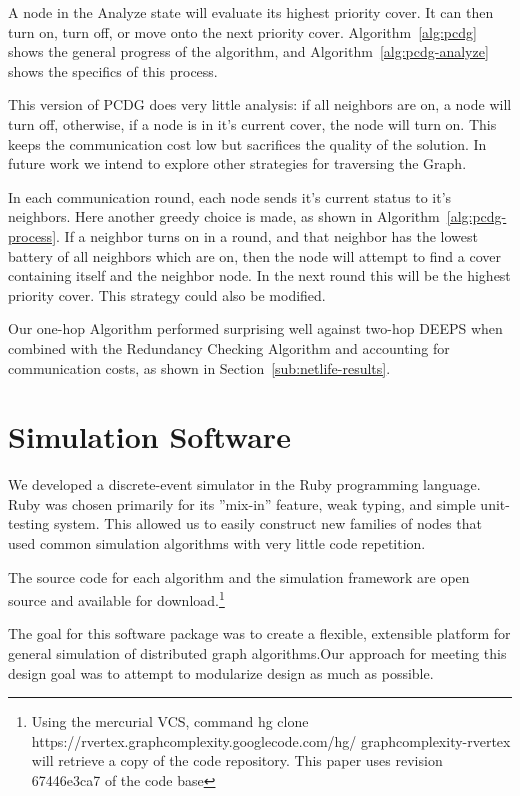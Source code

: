 \documentclass[conference, 10pt]{IEEEtran}
\begin{document}
A node in the Analyze state will evaluate its highest priority cover. It can then turn on, turn off, or move onto the next priority cover. Algorithm~\ref{alg:pcdg} shows the general progress of the algorithm, and Algorithm~\ref{alg:pcdg-analyze} shows the specifics of this process.

This version of PCDG does very little analysis: if all neighbors are on, a node will turn off, otherwise, if a node is in it's current cover, the node will turn on. This keeps the communication cost low but sacrifices the quality of the solution. In future work we intend to explore other strategies for traversing the Graph.

In each communication round, each node sends it's current status to it's neighbors. Here another greedy choice is made, as shown in Algorithm~\ref{alg:pcdg-process}. If a neighbor turns on in a round, and that neighbor has the lowest battery of all neighbors which are on, then the node will attempt to find a cover containing itself and the neighbor node. In the next round this will be the highest priority cover. This strategy could also be modified. 

Our one-hop Algorithm performed surprising well against two-hop DEEPS when combined with the Redundancy Checking Algorithm and accounting for communication costs, as shown in Section~\ref{sub:netlife-results}.




\section{Simulation Software}
\label{sec:simulator}

We developed a discrete-event simulator in the Ruby programming language. Ruby was chosen primarily for its ''mix-in'' feature, weak typing, and simple unit-testing system. This allowed us to easily construct new families of nodes that used common simulation algorithms with very little code repetition.

The source code for each algorithm and the simulation framework are open source and available for download.\footnote{Using the mercurial VCS, command hg clone https://rvertex.graphcomplexity.googlecode.com/hg/ graphcomplexity-rvertex will retrieve a copy of the code repository. This paper uses revision 67446e3ca7 of the code base} 

The goal for this software package was to create a flexible, extensible platform for general simulation of distributed graph algorithms.Our approach for meeting this design goal was to attempt to modularize design as much as possible.
\end{document}
